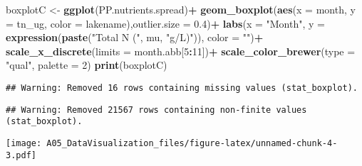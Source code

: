 \documentclass[
]{article}
\newenvironment{Shaded}{\begin{snugshade}}{\end{snugshade}}
\newcommand{\DataTypeTok}[1]{\textcolor[rgb]{0.13,0.29,0.53}{#1}}
\newcommand{\DecValTok}[1]{\textcolor[rgb]{0.00,0.00,0.81}{#1}}
\newcommand{\FloatTok}[1]{\textcolor[rgb]{0.00,0.00,0.81}{#1}}
\newcommand{\KeywordTok}[1]{\textcolor[rgb]{0.13,0.29,0.53}{\textbf{#1}}}
\newcommand{\NormalTok}[1]{#1}
\newcommand{\OperatorTok}[1]{\textcolor[rgb]{0.81,0.36,0.00}{\textbf{#1}}}
\newcommand{\StringTok}[1]{\textcolor[rgb]{0.31,0.60,0.02}{#1}}
\begin{document}
\begin{Shaded}
\begin{Highlighting}[]
\NormalTok{boxplotC <-}\StringTok{ }\KeywordTok{ggplot}\NormalTok{(PP.nutrients.spread)}\OperatorTok{+}
\StringTok{  }\KeywordTok{geom_boxplot}\NormalTok{(}\KeywordTok{aes}\NormalTok{(}\DataTypeTok{x =}\NormalTok{ month, }\DataTypeTok{y =}\NormalTok{ tn_ug, }\DataTypeTok{color =}\NormalTok{ lakename),}\DataTypeTok{outlier.size =} \FloatTok{0.4}\NormalTok{)}\OperatorTok{+}
\StringTok{  }\KeywordTok{labs}\NormalTok{(}\DataTypeTok{x =} \StringTok{"Month"}\NormalTok{, }\DataTypeTok{y =} \KeywordTok{expression}\NormalTok{(}\KeywordTok{paste}\NormalTok{(}\StringTok{"Total N ("}\NormalTok{, mu, }\StringTok{"g/L)"}\NormalTok{)),}
       \DataTypeTok{color =} \StringTok{""}\NormalTok{)}\OperatorTok{+}
\StringTok{  }\KeywordTok{scale_x_discrete}\NormalTok{(}\DataTypeTok{limits =}\NormalTok{ month.abb[}\DecValTok{5}\OperatorTok{:}\DecValTok{11}\NormalTok{])}\OperatorTok{+}
\StringTok{  }\KeywordTok{scale_color_brewer}\NormalTok{(}\DataTypeTok{type =} \StringTok{"qual"}\NormalTok{, }\DataTypeTok{palette =} \DecValTok{2}\NormalTok{)}
\KeywordTok{print}\NormalTok{(boxplotC)}
\end{Highlighting}
\end{Shaded}

\begin{verbatim}
## Warning: Removed 16 rows containing missing values (stat_boxplot).
\end{verbatim}

\begin{verbatim}
## Warning: Removed 21567 rows containing non-finite values (stat_boxplot).
\end{verbatim}

\texttt{[image: A05\_DataVisualization\_files/figure-latex/unnamed-chunk-4-3.pdf]}
\end{document}

